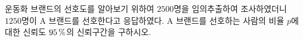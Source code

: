 운동화 브랜드의 선호도를 알아보기 위하여 $2500$명을 임의추출하여 조사하였더니 $1250$명이 A 브랜드를 선호한다고 응답하였다. A 브랜드를 선호하는 사람의 비율 $p$에 대한 신뢰도 $95\mkern3mu \%$의 신뢰구간을 구하시오. 
